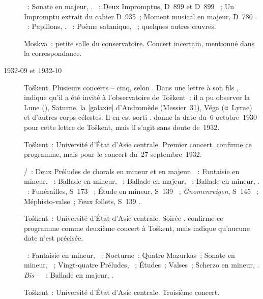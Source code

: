 \begin{description}
 \textsc{\Beethoven{}}~: Sonate en \kD majeur, .
 \textsc{\Schubert{}}~: Deux Impromptus, D~899  et D~899
 ~; Un Impromptu extrait du cahier D~935~; Moment musical en \kA
 \Flat majeur, D~780 .
 \textsc{\Schumann{}}~: Papillons, .
 \textsc{\Scriabine{}}~: Poème satanique, ~; quelques autres
 œuvres.
 \item[\DateWithWeekDay{1932-07-17}]
 Moskva~: petite salle du conservatoire.
 Concert incertain, mentionné dans la correspondance.
 \item[1932-09 et 1932-10]
 Toškent.
 Plusieurs concerts -- cinq, selon \citet[p.~155]{Nekrasova08}.
 Dans une lettre à son fils \citet[p.~44]{Sofronitsky82b}, \VSofronitsky{}
 indique qu'il a été invité à l'observatoire de Toškent~: il a pu observer
 la Lune (), Saturne, la [galaxie]
 d'Andromède (Messier~31), Véga (α~Lyrae) et d'autres corps célestes.
 Il en est sorti .
 \citet[p.~44]{Sofronitsky82b} donne la date du~6 octobre~1930 pour cette
 lettre de Toškent, mais il s'agit sans doute de~1932.
 \item[\DateWithWeekDay{1932-09-24}]
 Toškent~: Université d'\hbox{État} d'\hbox{Asie} centrale.
 Premier concert.
 \citet[p.~155]{Nekrasova08} confirme ce programme, mais pour le concert
 du~27 septembre~1932.

 \textsc{\JBach{}/\Busoni{}}~: Deux Préludes de chorals en \kG mineur et en
 \kG majeur.
 \textsc{\Mozart{}}~: Fantaisie en \kC mineur.
 \textsc{\Chopin{}}~: Ballade en \kF mineur, ~; Ballade en \kA
 \Flat majeur, ~; Ballade en \kG mineur, .
 \textsc{\Liszt{}}~: Funérailles, S~173 ~; Étude en \kF mineur,
 S~139 ~; \emph{Gnomenreigen}, S~145 ~;
 Méphisto-valse~; Feux follets, S~139 .
 \item[\DateWithWeekDay{1932-09-27}]
 Toškent~: Université d'\hbox{État} d'\hbox{Asie} centrale.
 Soirée \Chopin{}.
 \citet[p.~155]{Nekrasova08} confirme ce programme comme deuxième concert à
 Toškent, mais indique qu'aucune date n'est précisée.

 \textsc{\Chopin{}}~: Fantaisie en \kF mineur, ~; Nocturne~; Quatre
 Mazurkas~; Sonate en \kB \Flat mineur, ~; Vingt-quatre Préludes,
 ~; Études~; Valses~; Scherzo en \kB mineur, .
 \emph{Bis} -- \textsc{\Chopin{}}~: Ballade en \kA \Flat majeur, .
 \item[\DateWithWeekDay{1932-09-30}]
 Toškent~: Université d'\hbox{État} d'\hbox{Asie} centrale.
 Troisième concert.


\end{description}
